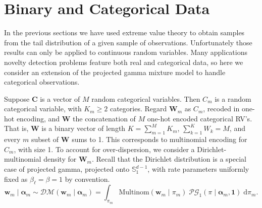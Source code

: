 \section{Binary and Categorical Data\label{sec:categorical}}
In the previous sections we have used extreme value theory to obtain samples
    from the tail distribution of a given sample of observations. Unfortunately 
    those results can only be applied to continuous random variables.  Many 
    applications novelty detection problems feature both real and categorical 
    data, so here we consider an extension of the projected gamma mixture model 
    to handle categorical observations. 

Suppose $\bm{C}$ is a vector of $M$ random categorical variables.  Then $C_m$ 
    is a random categorical variable, with $K_{m} \geq 2$ categories. Regard 
    $\bm{W}_m$ as $C_m$, recoded in one-hot encoding, and $\bm{W}$ the 
    concatenation of $M$ one-hot encoded categorical RV's. That is, $\bm{W}$ 
    is a binary vector of length $K = \sum_{m = 1}^M K_{m}$, 
    $\sum_{k = 1}^K W_k = M$, and every $m$ subset of $\bm{W}$ sums to 1.  This 
    corresponds to multinomial encoding for $C_m$, with size 1. To account for
    over-dispersion, we consider a Dirichlet-multinomial density for $\bm{W}_m$.
    Recall that the Dirichlet distribution is a special case of projected gamma,
    projected onto $\mathbb{S}_1^{d-1}$, with rate parameters uniformly fixed
    as $\beta_{\ell} = \beta = 1$ by convention. 
    \begin{equation}
        \label{eqn:dirmultinom}
        \bm{w}_{m}\mid\bm{\alpha}_m 
        \sim 
        \mathcal{DM}(\bm{w}_m\mid\bm{\alpha}_m) =
        \int_{\pi_{m}} 
        \text{Multinom}(\bm{w}_{m}\mid\pi_{m})\;
        \mathcal{PG}_1(\pi\mid\bm{\alpha}_m,\bm{1})\;\text{d}\pi_{m}.
    \end{equation}
